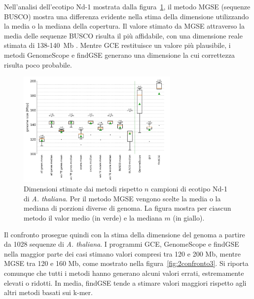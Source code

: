 \documentclass[crop=false, class=book]{standalone}
\begin{document}
	Nell'analisi dell'\gls{ecotipo} Nd-1 mostrata dalla figura~\ref{fig:2confronto1b}, il metodo MGSE (sequenze BUSCO) mostra una differenza evidente nella stima della dimensione utilizzando la media o la mediana della copertura. Il valore stimato da MGSE attraverso la media delle sequenze BUSCO risulta il più affidabile, con una dimensione reale stimata di 138-140~Mb \cite{pucker2016denovo}. Mentre GCE restituisce un valore più plausibile, i metodi GenomeScope e findGSE generano una dimensione la cui correttezza risulta poco probabile.

	\begin{figure}[]
		\centering
		\includegraphics[width=0.7\textwidth]{capitoli/analisi/confronto/confronto2/1b.png}
		\caption{Dimensioni stimate dai metodi rispetto $n$ campioni di \gls{ecotipo} Nd-1 di \textit{A. thaliana}. Per il metodo MGSE vengono scelte la media o la mediana di porzioni diverse di genoma. La figura mostra per ciascun metodo il valor medio (in verde) e la mediana $m$ (in giallo).}
		\label{fig:2confronto1b}
	\end{figure}
	
	Il confronto prosegue quindi con la stima della dimensione del genoma a partire da 1028 sequenze di \textit{A. thaliana}. I programmi GCE, GenomeScope e findGSE nella maggior parte dei casi stimano valori compresi tra 120 e 200 Mb, mentre MGSE tra 120 e 160 Mb, come mostrato nella figura~\vref{fig:2confronto3}. Si riporta comunque che tutti i metodi hanno generano alcuni valori errati, estremamente elevati o ridotti. In media, findGSE tende a stimare valori maggiori rispetto agli altri metodi basati sui k-mer.
	
\end{document}
